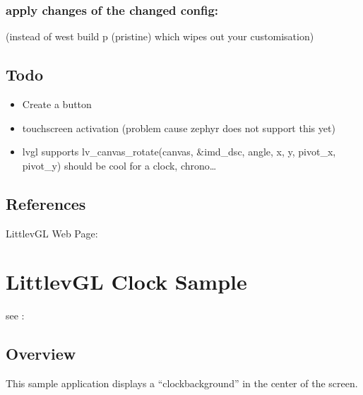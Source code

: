 \documentclass[letterpaper,10pt,english]{sphinxmanual}
\begin{document}
\subsection{apply changes of the changed config:}
\label{\detokenize{lvgl:apply-changes-of-the-changed-config}}
\begin{sphinxVerbatim}[commandchars=\\\{\}]
\end{sphinxVerbatim}

(instead of west build \sphinxhyphen{}p (pristine) which wipes out your customisation)


\section{Todo}
\label{\detokenize{lvgl:todo}}\begin{itemize}
\item {} 
Create a button

\item {} 
touchscreen activation (problem cause zephyr does not support this yet)

\item {} 
lvgl supports lv\_canvas\_rotate(canvas, \&imd\_dsc, angle, x, y, pivot\_x, pivot\_y) should be cool for a clock, chrono…

\end{itemize}


\section{References}
\label{\detokenize{lvgl:references}}

LittlevGL Web Page: 


\chapter{LittlevGL Clock Sample}
\label{\detokenize{clock:littlevgl-clock-sample}}\label{\detokenize{clock:lvgl-clock}}\label{\detokenize{clock::doc}}
see : {\hyperref[\detokenize{samples/gui/clock/README:clock-sample}]{}}


\section{Overview}
\label{\detokenize{clock:overview}}
This sample application displays a “clockbackground” in the center of the screen.
\end{document}
